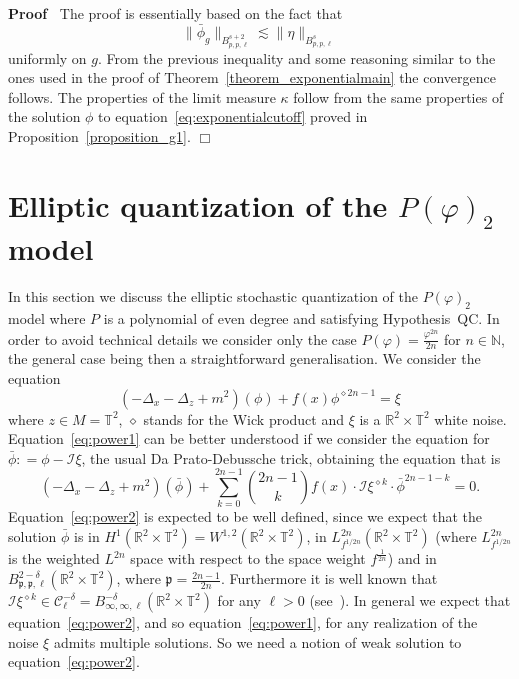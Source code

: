 \documentclass[a4paper,10pt]{article}
\newenvironment{proof}{\noindent\textbf{Proof\ }}{\hspace*{\fill}$\Box$\medskip}
\begin{document}
\begin{proof}
  The proof is essentially based on the fact that
  \[ \| \bar{\phi}_g \|_{B^{s + 2}_{p, p, \ell}} \lesssim \| \eta \|_{B^s_{p,
     p, \ell}} \]
  uniformly on $g$. From the previous inequality and some reasoning similar to
  the ones used in the proof of Theorem~\ref{theorem_exponentialmain} the
  convergence follows. The properties of the limit measure $\kappa$ follow
  from the same properties of the solution $\phi$ to
  equation~{\eqref{eq:exponentialcutoff}} proved in
  Proposition~\ref{proposition_g1}.
\end{proof}

\section{Elliptic quantization of the $P (\varphi)_2$
model}\label{section_power}

In this section we discuss the elliptic stochastic quantization of the $P
(\varphi)_2$ model where $P$ is a polynomial of even degree and satisfying
Hypothesis~QC. In order to avoid technical details we consider only the case
$P (\varphi) = \frac{\varphi^{2 n}}{2 n}$ for $n \in \mathbb{N}$, the general
case being then a straightforward generalisation. We consider the equation
\begin{equation}
  (- \Delta_x - \Delta_z + m^2) (\phi) + f (x) \phi^{\diamond 2 n - 1} = \xi
  \label{eq:power1}
\end{equation}
where $z \in M =\mathbb{T}^2$, $\diamond$ stands for the Wick product and
$\xi$ is a $\mathbb{R}^2 \times \mathbb{T}^2$ white noise.
Equation~{\eqref{eq:power1}} can be better understood if we consider the
equation for $\bar{\phi} : = \phi - \mathcal{I} \xi$, the usual Da
Prato-Debussche trick, obtaining the equation that is
\begin{equation}
  (- \Delta_x - \Delta_z + m^2) (\bar{\phi}) + \sum_{k = 0}^{2 n - 1} \binom{2
  n - 1}{k} f (x) \cdot \mathcal{I} \xi^{\diamond k} \cdot \bar{\phi}^{2 n - 1
  - k} = 0. \label{eq:power2}
\end{equation}
Equation~{\eqref{eq:power2}} is expected to be well defined, since we expect
that the solution $\bar{\phi}$ is in $H^1 (\mathbb{R}^2 \times \mathbb{T}^2) =
W^{1, 2} (\mathbb{R}^2 \times \mathbb{T}^2)$, in $L^{2 n}_{f^{1 / 2 n}}
(\mathbb{R}^2 \times \mathbb{T}^2)$ (where $L^{2 n}_{f^{1 / 2 n}}$ is the
weighted $L^{2 n}$ space with respect to the space weight $f^{\frac{1}{2 n}}$)
and in $B^{2 - \delta}_{\mathfrak{p}, \mathfrak{p}, \ell} (\mathbb{R}^2 \times
\mathbb{T}^2)$, where $\mathfrak{p =} \frac{2 n - 1}{2 n}$. Furthermore it is
well known that $\mathcal{I} \xi^{\diamond k} \in \mathcal{C}^{-
\delta}_{\ell} = B^{- \delta}_{\infty, \infty, \ell} (\mathbb{R}^2 \times
\mathbb{T}^2)$ for any $\ell > 0$ (see~{\cite{GH18}}). In general we expect
that equation~{\eqref{eq:power2}}, and so equation~{\eqref{eq:power1}}, for
any realization of the noise $\xi$ admits multiple solutions. So we need a
notion of weak solution to equation~{\eqref{eq:power2}}.
\end{document}
